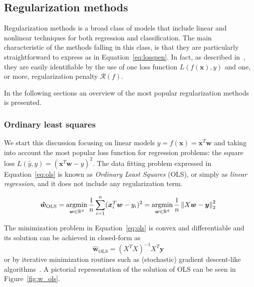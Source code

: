 	    \subsection{Regularization methods} \label{subsec:regularization_methods}
	    Regularization methods is a broad class of models that include linear and nonlinear techniques for both regression and classification. The main characteristic of the methods falling in this class, is that they are particularly straightforward to express as in Equation~\eqref{eq:losspen}. In fact, as described in~\cite{evgeniou2000regularization}, they are easily identifiable by the use of one loss function $L(f(\bm{x}), y)$ and one, or more, regularization penalty $\mathcal{R}(f)$.

	    In the following sections an overview of the most popular regularization methods is presented.

			\subsubsection{Ordinary least squares} \label{sec:ols}
			We start this discussion focusing on linear models $\hat y = f(\bm{x})=\bm{x}^T\bm{w}$ and taking into account the most popular loss function for regression problems: the square loss $L(\hat y, y) = (\bm{x}^T\bm{w}-y)^2$. The data fitting problem expressed in Equation~\eqref{eq:ols} is known as \textit{Ordinary Least Squares} (\ac{OLS}), or simply as \textit{linear regression}, and it does not include any regularization term.

			\begin{equation} \label{eq:ols}
				\bm{\hat w}_{\text{OLS}} = \mathop{\mathrm{argmin}}\limits_{\bm{w} \in \mathbb{R}^d} \frac{1}{n} \sum_{i=1}^n (\bm{x}_i^T\bm{w} - y_i)^2 = \mathop{\mathrm{argmin}}\limits_{\bm{w} \in \mathbb{R}^d} \frac{1}{n} \left\lVert X\bm{w} - \bm{y}\right\rVert_2^2
			\end{equation}

			The minimization problem in Equation~\eqref{eq:ols} is convex and differentiable and its solution can be achieved in closed-form as
			$$
				\bm{\hat w}_{\text{OLS}} = (X^TX)^{-1}X^T\bm{y}
			$$
			or by iterative minimization routines such as (stochastic) gradient descent-like algorithms~\cite{boyd2004convex, sra2012optimization}. A pictorial representation of the solution of OLS can be seen in Figure~\ref{fig:w_ols}.

